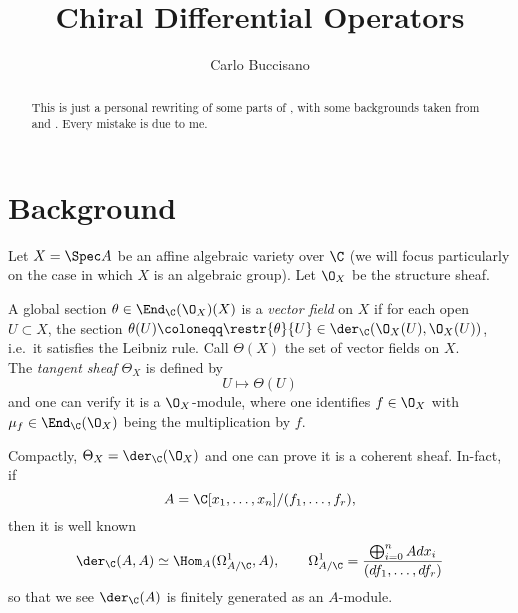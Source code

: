 \documentclass[a4paper, 10pt]{article}
\author{Carlo Buccisano}
\title{Chiral Differential Operators}
\begin{document}
    \maketitle
    \begin{abstract}
        This is just a personal rewriting of some parts of \cite{ArMo:Vert}, with some backgrounds taken from \cite{agln} and \cite{Malikov2017}. Every mistake is due to me. 
    \end{abstract}
    \section{Background}
        Let $X = \Spec A$ be an affine algebraic variety over $\C$ (we will focus particularly on the case in which $X$ is an algebraic group).
        Let $\O_X$ be the structure sheaf.
        \begin{defn}
            A global section $\theta \in \End_{\C}(\O_X)(X)$ is a \emph{vector field} on $X$ if for each open $U \subset X$, the section $\theta(U) \coloneqq \restr{\theta}{U} \in \der_{\C}(\O_X(U), \O_X(U))$, i.e.\ it satisfies the Leibniz rule. Call  $\Theta(X)$ the set of vector fields on $X$.\\ 
            The \emph{tangent sheaf} $\Theta_X$ is defined by \[U \mapsto \Theta(U) \] and one can verify it is a $\O_X$-module, where one identifies $f \in \O_X$ with $\mu_f \in \End_{\C}(\O_X)$ being the multiplication by $f$.
        \end{defn}
        Compactly, $\Theta_X = \der_{\C}(\O_X)$ and one can prove it is a coherent sheaf. In-fact, if \[A = \C[x_1, \dots, x_n]/(f_1, \dots, f_r),\] then it is well known \[\der_{\C}(A, A) \simeq \Hom_A(\Omega_{A/\C}^1, A), \qquad \Omega_{A/\C}^1 = \frac{\bigoplus_{i=0}^n Adx_i}{(df_1, \dots, df_r)} \] so that we see $\der_{\C}(A)$ is finitely generated as an $A$-module.
\end{document}

